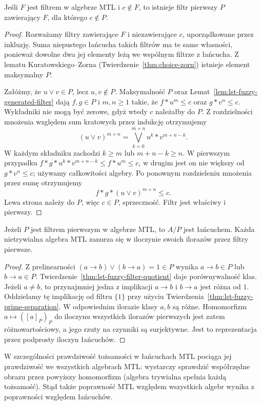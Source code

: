 \begin{twierdzenie}
\label{thm:lst-fuzzy-prime-separation}
Jeśli $F$ jest filtrem w algebrze MTL i $c\notin F$, to istnieje
filtr pierwszy $P$ zawierający $F$, dla którego $c\notin P$.
\end{twierdzenie}
\begin{proof}
Rozważamy filtry zawierające $F$ i niezawierające $c$, uporządkowane
przez inkluzję. Suma niepustego łańcucha takich filtrów ma te same
własności, ponieważ dowolne dwa jej elementy leżą we wspólnym
filtrze z łańcucha. Z lematu Kuratowskiego--Zorna (Twierdzenie~\ref{thm:choice-zorn})
istnieje element maksymalny $P$.

Załóżmy, że $u\vee v\in P$, lecz $u,v\notin P$.
Maksymalność $P$ oraz Lemat~\ref{lem:lst-fuzzy-generated-filter}
dają $f,g\in P$ i $m,n\geq1$ takie, że
$f*u^m\leq c$ oraz $g*v^n\leq c$. Wykładniki nie mogą być
zerowe, gdyż wtedy $c$ należałby do $P$.
Z rozdzielności mnożenia względem sum kratowych przez indukcję
otrzymujemy
\[
 (u\vee v)^{m+n}=\bigvee_{k=0}^{m+n} u^k*v^{m+n-k}.
\]
W każdym składniku zachodzi $k\geq m$ lub $m+n-k\geq n$.
W pierwszym przypadku
$f*g*u^k*v^{m+n-k}\leq f*u^m\leq c$, w drugim jest on
nie większy od $g*v^n\leq c$; używamy całkowitości algebry.
Po ponownym rozdzieleniu mnożenia przez sumę otrzymujemy
\[
 f*g*(u\vee v)^{m+n}\leq c.
\]
Lewa strona należy do $P$, więc $c\in P$, sprzeczność.
Filtr jest właściwy i pierwszy.
\end{proof}

\begin{wniosek}
\label{cor:lst-fuzzy-chain-quotient}
Jeżeli $P$ jest filtrem pierwszym w algebrze MTL, to $A/P$
jest łańcuchem. Każda nietrywialna algebra MTL zanurza się
w iloczynie swoich ilorazów przez filtry pierwsze.
\end{wniosek}
\begin{proof}
Z prelinearności $(a\to b)\vee(b\to a)=1\in P$ wynika
$a\to b\in P$ lub $b\to a\in P$.
Twierdzenie~\ref{thm:lst-fuzzy-filter-quotient} daje porównywalność klas.
Jeżeli $a\ne b$, to przynajmniej jedna z implikacji $a\to b$
i $b\to a$ jest różna od $1$. Oddzielamy tę implikację
od filtru $\{1\}$ przy użyciu
Twierdzenia~\ref{thm:lst-fuzzy-prime-separation}.
W odpowiednim ilorazie klasy $a,b$ są różne. Homomorfizm
$a\mapsto([a]_P)_P$ do iloczynu wszystkich ilorazów pierwszych
jest zatem różnowartościowy, a jego rzuty na czynniki są
surjektywne. Jest to reprezentacja przez podprosty iloczyn
łańcuchów.
\end{proof}
W szczególności prawdziwość tożsamości w łańcuchach MTL
pociąga jej prawdziwość we wszystkich algebrach MTL:
wystarczy sprawdzić współrzędne obrazu przez powyższy homomorfizm
(algebra trywialna spełnia każdą tożsamość).
Stąd także poprawność MTL względem wszystkich algebr wynika
z poprawności względem łańcuchów.


